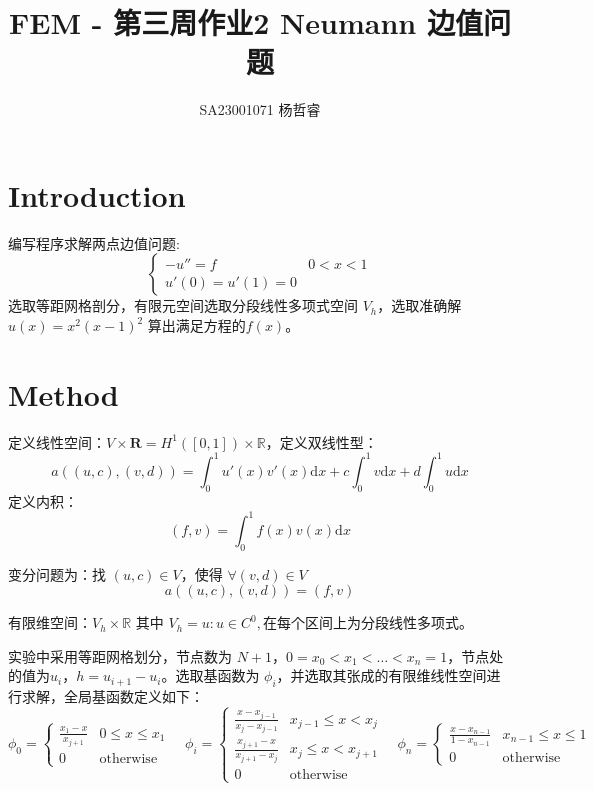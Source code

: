 \documentclass{ctexart}
\title{FEM - 第三周作业2 Neumann 边值问题}
\author{SA23001071 杨哲睿}
\begin{document}
\maketitle

\section{Introduction}
编写程序求解两点边值问题:
\begin{equation}
  \begin{cases}
    - u'' = f & 0 < x < 1\\
    u'(0) = u'(1) = 0
  \end{cases}
\end{equation}
选取等距网格剖分，有限元空间选取分段线性多项式空间 $V_h$，选取准确解 $u(x) = x^2(x-1)^2$ 算出满足方程的$f(x)$。

\section{Method}

定义线性空间：$V \times \mathbf{R}= H^1([0,1]) \times \mathbb{R}$，定义双线性型：
$$ a((u, c), (v, d)) = \int_0^1 u'(x) v'(x) \mathrm dx + c \int_0^1 v \mathrm dx + d\int_0^1 u \mathrm dx $$
定义内积：
$$ (f, v) = \int_0^1 f(x) v(x) \mathrm dx $$

变分问题为：找 $(u, c) \in V$，使得 $\forall (v, d) \in V$
\begin{equation}
  a((u, c), (v, d)) = (f, v)
\end{equation}

有限维空间：$V_h \times \mathbb{R}$ 其中 $V_h={u: u \in C^0, \text{在每个区间上为分段线性多项式}}$。

实验中采用等距网格划分，节点数为 $N+1$，$0 = x_0 < x_1 < \dots < x_n = 1$，节点处的值为$u_i$，$h = u_{i+1} - u_i$。选取基函数为 $\phi_i$，并选取其张成的有限维线性空间进行求解，全局基函数定义如下：
\begin{equation}
  \phi_0 = \begin{cases}
    \frac{x_{1} - x}{x_{j+1}} & 0 \le x \le x_{1}\\
    0 & \text{otherwise}
  \end{cases}
  \quad
  \phi_i = \begin{cases}
      \frac{x - x_{j-1}}{x_j - x_{j-1}} & x_{j-1} \le x < x_j\\
      \frac{x_{j+1} - x}{x_{j+1} - x_{j}} & x_{j} \le x < x_{j+1}\\
      0 & \text{otherwise}
  \end{cases}
  \quad
  \phi_n = \begin{cases}
    \frac{x-x_{n-1}}{1-x_{n-1}} & x_{n-1} \le x \le 1\\
    0 & \text{otherwise}
  \end{cases}
\end{equation}
\end{document}
